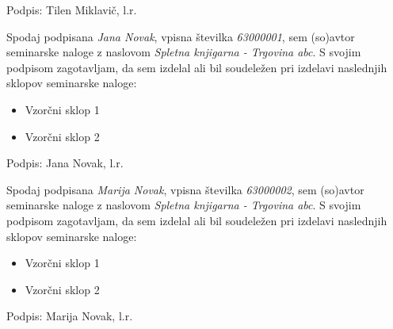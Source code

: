 \documentclass[a4paper,12pt]{report}
\newcommand{\naslov}     {Spletna knjigarna - Trgovina abc}
\newcommand{\prviavtor}  {Tilen Miklavič}
\newcommand{\drugiavtor} {Jana Novak}
\newcommand{\drugiindeks}{63000001}
\newcommand{\tretjiavtor} {Marija Novak}
\newcommand{\tretjiindeks}{63000002}
\begin{document}
Podpis: {\prviavtor}, l.r.

\newpage

Spodaj podpisana \textit{\drugiavtor}, vpisna številka \textit{\drugiindeks}, sem (so)avtor seminarske naloge z naslovom \textit{\naslov}. S svojim podpisom zagotavljam, da sem izdelal ali bil soudeležen pri izdelavi naslednjih sklopov seminarske naloge:
\begin{itemize}
    \item Vzorčni sklop 1
	 \item Vzorčni sklop 2
\end{itemize}

Podpis: {\drugiavtor}, l.r.

\newpage

Spodaj podpisana \textit{\tretjiavtor}, vpisna številka \textit{\tretjiindeks}, sem (so)avtor seminarske naloge z naslovom \textit{\naslov}. S svojim podpisom zagotavljam, da sem izdelal ali bil soudeležen pri izdelavi naslednjih sklopov seminarske naloge:
\begin{itemize}
    \item Vzorčni sklop 1
	 \item Vzorčni sklop 2
\end{itemize}

Podpis: {\tretjiavtor}, l.r.
\end{document}
